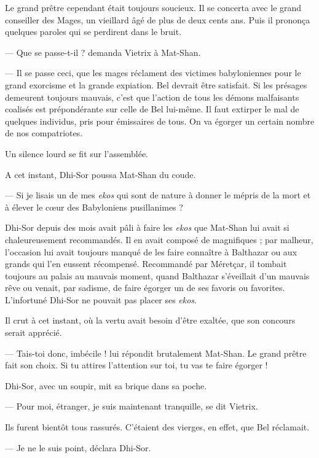 \documentclass[a4paper, 11pt, oneside, polutonikogreek, french]{article}
\begin{document}
\bigskip
\centerline{\EightStarTaper}
\centerline{\EightStarTaper\EightStarTaper}
\bigskip

Le grand prêtre cependant était toujours soucieux. Il se concerta avec le grand conseiller des Mages, un vieillard âgé de plus de deux cents ans. Puis il prononça quelques paroles qui se perdirent dans le bruit.

--- Que se passe-t-il ? demanda Vietrix à Mat-Shan.

--- Il se passe ceci, que les mages réclament des victimes babyloniennes pour le grand exorcisme et la grande expiation. Bel devrait être satisfait. Si les présages demeurent toujours mauvais, c'est que l'action de tous les démons malfaisants coalisés est prépondérante sur celle de Bel lui-même. Il faut extirper le mal de quelques individus, pris pour émissaires de tous. On va égorger un certain nombre de nos compatriotes.

Un silence lourd se fit sur l'assemblée.

A cet instant, Dhi-Sor poussa Mat-Shan du coude.

--- Si je lisais un de mes \emph{ekos} qui sont de nature à donner le mépris de la mort et à élever le cœur des Babyloniens pusillanimes ?

Dhi-Sor depuis des mois avait pâli à faire les \emph{ekos} que Mat-Shan lui avait si chaleureusement recommandés. Il en avait composé de magnifiques ; par malheur, l'occasion lui avait toujours manqué de les faire connaître à Balthazar ou aux grands qui l'en eussent récompensé. Recommandé par Méretçar, il tombait toujours au palais au mauvais moment, quand Balthazar s'éveillait d'un mauvais rêve ou venait, par sadisme, de faire égorger un de ses favoris ou favorites. L'infortuné Dhi-Sor ne pouvait pas placer ses \emph{ekos}.

Il crut à cet instant, où la vertu avait besoin d'être exaltée, que son concours serait apprécié.

--- Tais-toi donc, imbécile ! lui répondit brutalement Mat-Shan. Le grand prêtre fait son choix. Si tu attires l'attention sur toi, tu vas te faire égorger !

Dhi-Sor, avec un soupir, mit sa brique dans sa poche.

--- Pour moi, étranger, je suis maintenant tranquille, se dit Vietrix.

Ils furent bientôt tous rassurés. C'étaient des vierges, en effet, que Bel réclamait.

--- Je ne le suis point, déclara Dhi-Sor.
\end{document}
